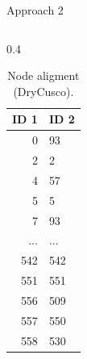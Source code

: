 \documentclass[aspectratio=169]{beamer}
\begin{document}
    \begin{frame}{Approach 2}
        \begin{columns}[t] %
            \begin{column}{0.4\textwidth}
                \begin{table}[htp!]
                    \scriptsize
                    \centering
                    \caption{Node aligment (DryCusco).}
                    \begin{tabular}{rl}\toprule
                        ID 1 & ID 2 \\\midrule                        
                        0 & 93 \\
                        \rowcolor{yellow}
                        2 & 2 \\
                        4 & 57 \\
                        \rowcolor{yellow}
                        5 & 5 \\
                        7 & 93 \\
                        ... & ... \\
                        \rowcolor{yellow}
                        542 & 542 \\
                        \rowcolor{yellow}
                        551 & 551 \\
                        556 & 509 \\
                        557 & 550 \\
                        558 & 530 \\\bottomrule
                    \end{tabular}
                \end{table}
            \end{column}
            

\end{columns}
\end{frame}
\end{document}
